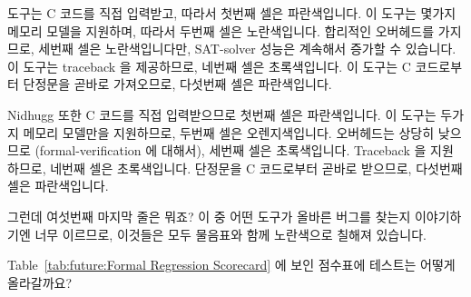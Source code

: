  도구는 C 코드를 직접 입력받고, 따라서 첫번째 셀은 파란색입니다.
이 도구는 몇가지 메모리 모델을 지원하며, 따라서 두번째 셀은 노란색입니다.
합리적인 오버헤드를 가지므로, 세번째 셀은 노란색입니다만, SAT-solver 성능은
계속해서 증가할 수 있습니다.
이 도구는 traceback 을 제공하므로, 네번째 셀은 초록색입니다.
이 도구는 C 코드로부터 단정문을 곧바로 가져오므로, 다섯번째 셀은 파란색입니다.

Nidhugg 또한 C 코드를 직접 입력받으므로 첫번째 셀은 파란색입니다.
이 도구는 두가지 메모리 모델만을 지원하므로, 두번째 셀은 오렌지색입니다.
오버헤드는 상당히 낮으므로 (formal-verification 에 대해서), 세번째 셀은 초록색입니다.
Traceback 을 지원하므로, 네번째 셀은 초록색입니다.
단정문을 C 코드로부터 곧바로 받으므로, 다섯번째 셀은 파란색입니다.

그런데 여섯번째 마지막 줄은 뭐죠?
이 중 어떤 도구가 올바른 버그를 찾는지 이야기하기엔 너무 이르므로, 이것들은
모두 물음표와 함께 노란색으로 칠해져 있습니다.
\iffalse

The \co{cbmc} tool inputs C code directly, so its first cell is blue.
It supports a few memory models, so its second cell is yellow.
It has reasonable overhead, so its third cell is also yellow, however,
perhaps SAT-solver performance will continue improving.
It provides a traceback, so its fourth cell is green.
It takes assertions directly from the C code, so its fifth cell is blue.

Nidhugg also inputs C code directly, so its first cell is also blue.
It supports only a couple of memory models, so its second cell is orange.
Its overhead is quite low (for formal-verification), so its
third cell is green.
It provides a traceback, so its fourth cell is green.
It takes assertions directly from the C code, so its fifth cell is blue.

So what about the sixth and final row?
It is too early to tell how any of the tools do at finding the right bugs,
so they are all yellow with question marks.
\fi

\QuickQuiz{}
	Table~\ref{tab:future:Formal Regression Scorecard}
	에 보인 점수표에 테스트는 어떻게 올라갈까요?
	\iffalse

